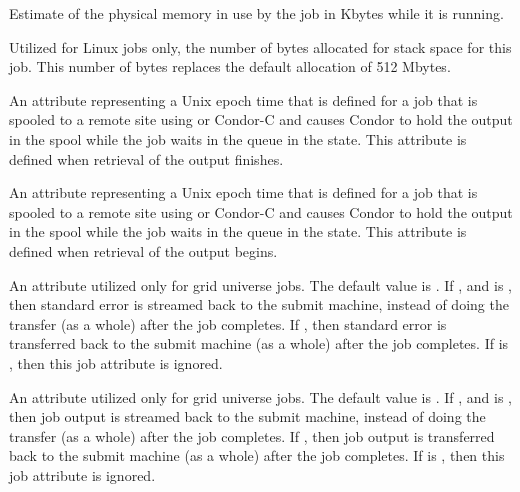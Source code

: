 \begin{description}
\item[\AdAttr{ResidentSetSize}:]  Estimate of the physical memory
in use by the job in Kbytes while it is running.

\item[\AdAttr{StackSize}:]   
Utilized for Linux jobs only, 
the number of bytes allocated for stack space for this job.
This number of bytes replaces the default allocation of 512 Mbytes.

\item[\AdAttr{StageOutFinish}:]   
An attribute representing a Unix epoch time that is defined for a job that is
spooled to a remote site using  or Condor-C
and causes Condor to hold the output in the spool while the job waits 
in the queue in the  state.
This attribute is defined when retrieval of the output finishes.

\item[\AdAttr{StageOutStart}:]   
An attribute representing a Unix epoch time that is defined for a job that is
spooled to a remote site using  or Condor-C
and causes Condor to hold the output in the spool while the job waits 
in the queue in the  state.
This attribute is defined when retrieval of the output begins.

\item[\AdAttr{StreamErr}:]   
An attribute utilized only for grid universe jobs.
The default value is .
If , and  is , then 
standard error is streamed back to the submit machine, instead
of doing the transfer (as a whole) after the job completes.
If , then
standard error is transferred back to the submit machine
(as a whole) after the job completes.
If  is , then this job attribute is ignored.

\item[\AdAttr{StreamOut}:]   
An attribute utilized only for grid universe jobs.
The default value is .
If , and  is , then 
job output is streamed back to the submit machine, instead
of doing the transfer (as a whole) after the job completes.
If , then
job output is transferred back to the submit machine
(as a whole) after the job completes.
If  is , then this job attribute is ignored.


\end{description}
